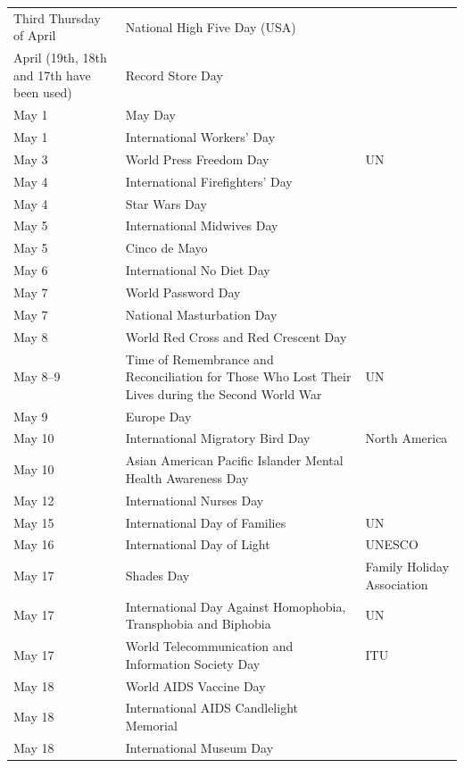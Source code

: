 \documentclass[
  openany]{book}
\begin{document}
\begin{longtable}[t]{>{\raggedright\arraybackslash}p{8em}>{\raggedright\arraybackslash}p{18em}>{\raggedright\arraybackslash}p{10em}}
\rowcolor{gray!6}  Third Thursday of April & National High Five Day (USA) & \\
April (19th, 18th and 17th have been used) & Record Store Day & \\
\addlinespace
\rowcolor{gray!6}  May 1 & May Day & \\
May 1 & International Workers' Day & \\
\rowcolor{gray!6}  May 3 & World Press Freedom Day & UN\\
May 4 & International Firefighters' Day & \\
\rowcolor{gray!6}  May 4 & Star Wars Day & \\
\addlinespace
May 5 & International Midwives Day & \\
\rowcolor{gray!6}  May 5 & Cinco de Mayo & \\
May 6 & International No Diet Day & \\
\rowcolor{gray!6}  May 7 & World Password Day & \\
May 7 & National Masturbation Day & \\
\addlinespace
\rowcolor{gray!6}  May 8 & World Red Cross and Red Crescent Day & \\
May 8–9 & Time of Remembrance and Reconciliation for Those Who Lost Their Lives during the Second World War & UN\\
\rowcolor{gray!6}  May 9 & Europe Day & \\
May 10 & International Migratory Bird Day & North America\\
\rowcolor{gray!6}  May 10 & Asian American Pacific Islander Mental Health Awareness Day & \\
\addlinespace
May 12 & International Nurses Day & \\
\rowcolor{gray!6}  May 15 & International Day of Families & UN\\
May 16 & International Day of Light & UNESCO\\
\rowcolor{gray!6}  May 17 & Shades Day & Family Holiday Association\\
May 17 & International Day Against Homophobia, Transphobia and Biphobia & UN\\
\addlinespace
\rowcolor{gray!6}  May 17 & World Telecommunication and Information Society Day & ITU\\
May 18 & World AIDS Vaccine Day & \\
\rowcolor{gray!6}  May 18 & International AIDS Candlelight Memorial & \\
May 18 & International Museum Day & \\

\end{longtable}
\end{document}

